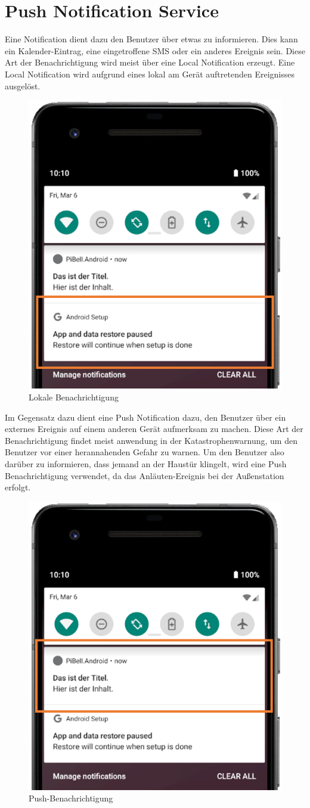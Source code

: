 \section{Push Notification Service}
Eine Notification dient dazu den Benutzer über etwas zu informieren. Dies kann ein Kalender-Eintrag, eine eingetroffene SMS oder ein anderes Ereignis sein. Diese Art der Benachrichtigung wird meist über eine Local Notification erzeugt. Eine Local Notification wird aufgrund eines lokal am Gerät auftretenden Ereignisses ausgelöst. %
\begin{figure}[H]
    \centering\includegraphics[width=.5\linewidth]{images/xamarin/LocalNotification.png}
    \caption{Lokale Benachrichtigung}
\end{figure}

Im Gegensatz dazu dient eine Push Notification dazu, den Benutzer über ein externes Ereignis auf einem anderen Gerät aufmerksam zu machen. Diese Art der Benachrichtigung findet meist anwendung in der Katastrophenwarnung, um den Benutzer vor einer herannahenden Gefahr zu warnen.
Um den Benutzer also darüber zu informieren, dass jemand an der Haustür klingelt, wird eine Push Benachrichtigung verwendet, da das Anläuten-Ereignis bei der Außenstation erfolgt.
\begin{figure}[H]
    \centering\includegraphics[width=.5\linewidth]{images/xamarin/PushNotification.png}
    \caption{Push-Benachrichtigung}
\end{figure}

